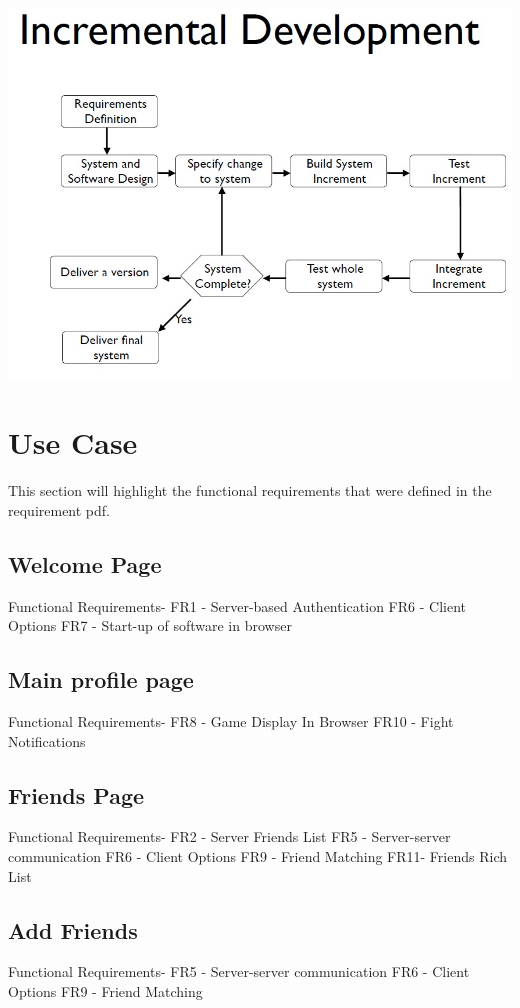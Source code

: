 \documentclass{project}
\begin{document}
\includegraphics[scale=0.5]{incremental.jpg}\\

\section{Use Case}
This section will highlight the functional requirements that were defined in the
requirement pdf.

\subsection{Welcome Page}
Functional Requirements-
FR1 - Server-based Authentication
FR6 - Client Options
FR7 - Start-up of software in browser

\subsection{Main profile page}
Functional Requirements-
FR8 - Game Display In Browser
FR10 - Fight Notifications

\subsection{Friends Page}
Functional Requirements-
FR2 - Server Friends List
FR5 - Server-server communication
FR6 - Client Options
FR9 - Friend Matching
FR11- Friends Rich List

\subsection{Add Friends}
Functional Requirements-
FR5 - Server-server communication
FR6 - Client Options
FR9 - Friend Matching
\end{document}
